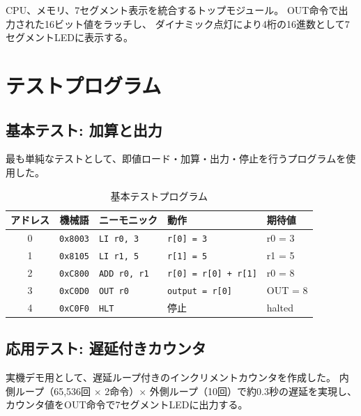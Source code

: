 \documentclass[a4paper,11pt]{ltjsarticle}
\begin{document}
CPU、メモリ、7セグメント表示を統合するトップモジュール。
OUT命令で出力された16ビット値をラッチし、
ダイナミック点灯により4桁の16進数として7セグメントLEDに表示する。




\section{テストプログラム}

\subsection{基本テスト: 加算と出力}

最も単純なテストとして、即値ロード・加算・出力・停止を行うプログラムを使用した。

\begin{table}[h]
\centering
\caption{基本テストプログラム}
\label{tab:test_basic}
\begin{tabular}{cclll}
\toprule
アドレス & 機械語 & ニーモニック & 動作 & 期待値 \\
\midrule
0 & \texttt{0x8003} & \texttt{LI r0, 3}   & \texttt{r[0] = 3}        & r0 = 3 \\
1 & \texttt{0x8105} & \texttt{LI r1, 5}   & \texttt{r[1] = 5}        & r1 = 5 \\
2 & \texttt{0xC800} & \texttt{ADD r0, r1} & \texttt{r[0] = r[0] + r[1]} & r0 = 8 \\
3 & \texttt{0xC0D0} & \texttt{OUT r0}     & \texttt{output = r[0]}   & OUT = 8 \\
4 & \texttt{0xC0F0} & \texttt{HLT}        & 停止                     & halted \\
\bottomrule
\end{tabular}
\end{table}

\subsection{応用テスト: 遅延付きカウンタ}

実機デモ用として、遅延ループ付きのインクリメントカウンタを作成した。
内側ループ（65,536回 $\times$ 2命令）$\times$ 外側ループ（10回）で約0.3秒の遅延を実現し、
カウンタ値をOUT命令で7セグメントLEDに出力する。
\end{document}
